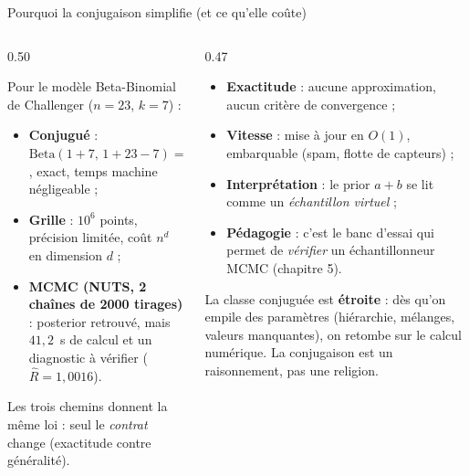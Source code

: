 \begin{frame}{Pourquoi la conjugaison simplifie (et ce qu'elle coûte)}
\footnotesize
\begin{columns}[t]
\begin{column}{0.50\textwidth}
\begin{ebox}
Pour le modèle Beta-Binomial de Challenger ($n = 23$, $k = 7$) :
\begin{itemize}
  \item \textbf{Conjugué} : $\mathrm{Beta}(1+7,\,1+23-7) = \mathrm{Beta}(8,17)$,
        exact, temps machine négligeable ;
  \item \textbf{Grille} : $10^6$ points, précision limitée, coût $n^{d}$ en dimension $d$ ;
  \item \textbf{MCMC (NUTS, 2 chaînes de 2000 tirages)} : posterior retrouvé,
        mais $41{,}2$~s de calcul et un diagnostic à vérifier ($\hat R = 1{,}0016$).
\end{itemize}
\vspace{1mm}
\centering\small Les trois chemins donnent la même loi : seul le \emph{contrat} change
(exactitude contre généralité).
\end{ebox}
\end{column}
\begin{column}{0.47\textwidth}
\begin{kbox}
\begin{itemize}
  \item \textbf{Exactitude} : aucune approximation, aucun critère de convergence ;
  \item \textbf{Vitesse} : mise à jour en $O(1)$, embarquable (spam, flotte de capteurs) ;
  \item \textbf{Interprétation} : le prior $a+b$ se lit comme un \emph{échantillon virtuel} ;
  \item \textbf{Pédagogie} : c'est le banc d'essai qui permet de \emph{vérifier} un
        échantillonneur MCMC (chapitre 5).
\end{itemize}
\end{kbox}
\begin{wbox}
La classe conjuguée est \textbf{étroite} : dès qu'on empile des paramètres
(hiérarchie, mélanges, valeurs manquantes), on retombe sur le calcul numérique.
La conjugaison est un raisonnement, pas une religion.
\end{wbox}
\end{column}
\end{columns}
\end{frame}


